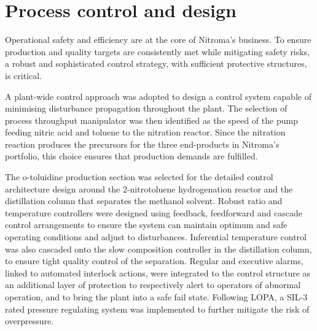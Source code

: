 \section*{Process control and design}

Operational safety and efficiency are at the core of Nitroma's business. To ensure production and quality targets are consistently met while mitigating safety risks, a robust and sophisticated control strategy, with sufficient protective structures, is critical.

A plant-wide control approach was adopted to design a control system capable of minimising disturbance propagation throughout the plant.  The selection of  process throughput manipulator was then identified as the speed of the pump feeding nitric acid and toluene to the nitration reactor. Since the nitration reaction produces the precursors for the three end-products in Nitroma's portfolio, this choice ensures that production demands are fulfilled.   


The o-toluidine production section was selected for the detailed control architecture design around the 2-nitrotoluene hydrogenation reactor and the distillation column that separates the methanol solvent. Robust ratio and temperature controllers were designed using feedback, feedforward and cascade control arrangements to ensure the system can maintain optimum and safe operating conditions and adjust to disturbances. Inferential temperature control was also cascaded onto the slow composition controller in the distillation column, to ensure tight quality control of the separation. 
Regular and executive alarms, linked to automated interlock actions, were integrated to the control structure as an additional layer of protection to respectively alert to operators of abnormal operation, and to bring the plant into a safe fail state. Following LOPA, a SIL-3 rated pressure regulating system was implemented to further mitigate the risk of overpressure.




